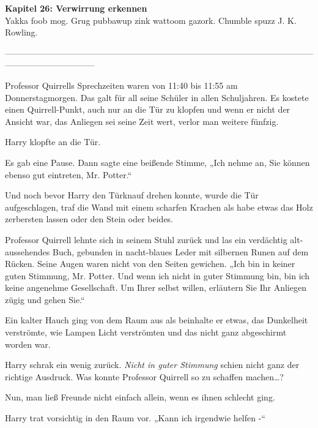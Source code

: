 

\hypertarget{verwirrung-erkennen}{%

\textbf{Kapitel 26: Verwirrung erkennen}\\

\hfill\break Yakka foob mog. Grug pubbawup zink wattoom gazork. Chumble spuzz J. K. Rowling.

--------------------------------------------------------------------------------------------------------------------------------------------

\hfill\break Professor Quirrells Sprechzeiten waren von 11:40 bis 11:55 am Donnerstagmorgen. Das galt für all seine Schüler in allen Schuljahren. Es kostete einen Quirrell-Punkt, auch nur an die Tür zu klopfen und wenn er nicht der Ansicht war, das Anliegen sei seine Zeit wert, verlor man weitere fünfzig.

Harry klopfte an die Tür.

Es gab eine Pause. Dann sagte eine beißende Stimme, „Ich nehme an, Sie können ebenso gut eintreten, Mr. Potter.“

Und noch bevor Harry den Türknauf drehen konnte, wurde die Tür aufgeschlagen, traf die Wand mit einem scharfen Krachen als habe etwas das Holz zerbersten lassen oder den Stein oder beides.

Professor Quirrell lehnte sich in seinem Stuhl zurück und las ein verdächtig alt-aussehendes Buch, gebunden in nacht-blaues Leder mit silbernen Runen auf dem Rücken. Seine Augen waren nicht von den Seiten gewichen. „Ich bin in keiner guten Stimmung, Mr. Potter. Und wenn ich nicht in guter Stimmung bin, bin ich keine angenehme Gesellschaft. Um Ihrer selbst willen, erläutern Sie Ihr Anliegen zügig und gehen Sie.“

Ein kalter Hauch ging von dem Raum aus als beinhalte er etwas, das Dunkelheit verströmte, wie Lampen Licht verströmten und das nicht ganz abgeschirmt worden war.

Harry schrak ein wenig zurück. \emph{Nicht in guter Stimmung} schien nicht ganz der richtige Ausdruck. Was konnte Professor Quirrell so zu schaffen machen…?

Nun, man ließ Freunde nicht einfach allein, wenn es ihnen schlecht ging.

Harry trat vorsichtig in den Raum vor. „Kann ich irgendwie helfen -“

}
